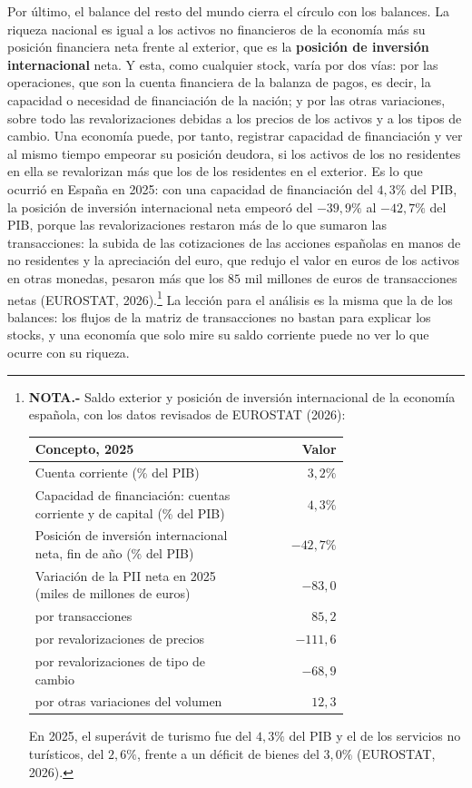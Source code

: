 \documentclass[10pt,a4paper]{article}
\begin{document}
Por último, el balance del resto del mundo cierra el círculo con los balances. La riqueza nacional es igual a los activos no financieros de la economía más su posición financiera neta frente al exterior, que es la \textbf{posición de inversión internacional} neta. Y esta, como cualquier stock, varía por dos vías: por las operaciones, que son la cuenta financiera de la balanza de pagos, es decir, la capacidad o necesidad de financiación de la nación; y por las otras variaciones, sobre todo las revalorizaciones debidas a los precios de los activos y a los tipos de cambio. Una economía puede, por tanto, registrar capacidad de financiación y ver al mismo tiempo empeorar su posición deudora, si los activos de los no residentes en ella se revalorizan más que los de los residentes en el exterior. Es lo que ocurrió en España en 2025: con una capacidad de financiación del $4{,}3\%$ del PIB, la posición de inversión internacional neta empeoró del $-39{,}9\%$ al $-42{,}7\%$ del PIB, porque las revalorizaciones restaron más de lo que sumaron las transacciones: la subida de las cotizaciones de las acciones españolas en manos de no residentes y la apreciación del euro, que redujo el valor en euros de los activos en otras monedas, pesaron más que los $85$ mil millones de euros de transacciones netas (EUROSTAT, 2026).\footnote{%
    \textbf{NOTA.-} Saldo exterior y posición de inversión internacional de la economía española, con los datos revisados de EUROSTAT (2026):
    \begin{center}
    \footnotesize
    \begin{tabular}{p{0.72\linewidth}r}
        \hline
        Concepto, 2025 & Valor \\
        \hline
        Cuenta corriente (\% del PIB) & $3{,}2\%$ \\
        Capacidad de financiación: cuentas corriente y de capital (\% del PIB) & $4{,}3\%$ \\
        Posición de inversión internacional neta, fin de año (\% del PIB) & $-42{,}7\%$ \\
        \hline
        Variación de la PII neta en 2025 (miles de millones de euros) & $-83{,}0$ \\
        \quad por transacciones & $85{,}2$ \\
        \quad por revalorizaciones de precios & $-111{,}6$ \\
        \quad por revalorizaciones de tipo de cambio & $-68{,}9$ \\
        \quad por otras variaciones del volumen & $12{,}3$ \\
        \hline
    \end{tabular}
    \end{center}
    En 2025, el superávit de turismo fue del $4{,}3\%$ del PIB y el de los servicios no turísticos, del $2{,}6\%$, frente a un déficit de bienes del $3{,}0\%$ (EUROSTAT, 2026).
} La lección para el análisis es la misma que la de los balances: los flujos de la matriz de transacciones no bastan para explicar los stocks, y una economía que solo mire su saldo corriente puede no ver lo que ocurre con su riqueza.
\end{document}
